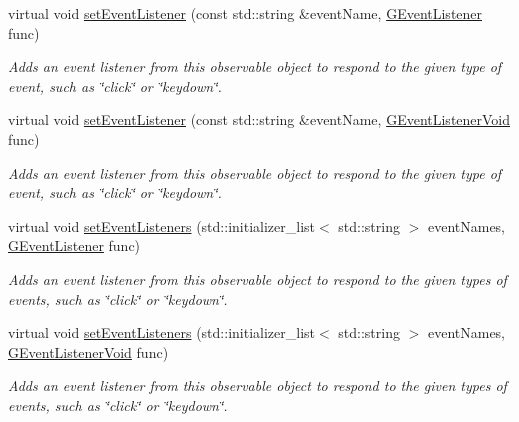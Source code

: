 \begin{DoxyCompactItemize}
virtual void \mbox{\hyperlink{classsgl_1_1GObservable_ad2f6d34961c50f6c1e0659990b79f741}{set\+Event\+Listener}} (const std\+::string \&event\+Name, \mbox{\hyperlink{namespacesgl_ae9f3e9eab70035da1a2b114e21357b25}{G\+Event\+Listener}} func)
\begin{DoxyCompactList}\small\item\em Adds an event listener from this observable object to respond to the given type of event, such as \char`\"{}click\char`\"{} or \char`\"{}keydown\char`\"{}. \end{DoxyCompactList}\item 
virtual void \mbox{\hyperlink{classsgl_1_1GObservable_abac4cb9f9e626e010e87f5d91573c8a5}{set\+Event\+Listener}} (const std\+::string \&event\+Name, \mbox{\hyperlink{namespacesgl_a54427ce97bb1c2804e4fe2b0a62e8b17}{G\+Event\+Listener\+Void}} func)
\begin{DoxyCompactList}\small\item\em Adds an event listener from this observable object to respond to the given type of event, such as \char`\"{}click\char`\"{} or \char`\"{}keydown\char`\"{}. \end{DoxyCompactList}\item 
virtual void \mbox{\hyperlink{classsgl_1_1GObservable_afa388d69c33c718cf035774604065604}{set\+Event\+Listeners}} (std\+::initializer\+\_\+list$<$ std\+::string $>$ event\+Names, \mbox{\hyperlink{namespacesgl_ae9f3e9eab70035da1a2b114e21357b25}{G\+Event\+Listener}} func)
\begin{DoxyCompactList}\small\item\em Adds an event listener from this observable object to respond to the given types of events, such as \char`\"{}click\char`\"{} or \char`\"{}keydown\char`\"{}. \end{DoxyCompactList}\item 
virtual void \mbox{\hyperlink{classsgl_1_1GObservable_a7867184bbb686f74fae8a4db927da799}{set\+Event\+Listeners}} (std\+::initializer\+\_\+list$<$ std\+::string $>$ event\+Names, \mbox{\hyperlink{namespacesgl_a54427ce97bb1c2804e4fe2b0a62e8b17}{G\+Event\+Listener\+Void}} func)
\begin{DoxyCompactList}\small\item\em Adds an event listener from this observable object to respond to the given types of events, such as \char`\"{}click\char`\"{} or \char`\"{}keydown\char`\"{}. \end{DoxyCompactList}\end{DoxyCompactItemize}

